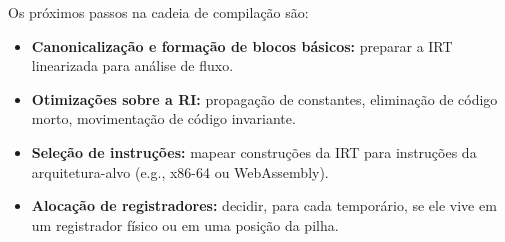 Os próximos passos na cadeia de compilação são:
\begin{itemize}
  \item \textbf{Canonicalização e formação de blocos básicos:}
    preparar a IRT linearizada para análise de fluxo.
  \item \textbf{Otimizações sobre a RI:}
    propagação de constantes, eliminação de código morto,
    movimentação de código invariante.
  \item \textbf{Seleção de instruções:}
    mapear construções da IRT para instruções da arquitetura-alvo
    (e.g., x86-64 ou WebAssembly).
  \item \textbf{Alocação de registradores:}
    decidir, para cada temporário, se ele vive em um registrador físico
    ou em uma posição da pilha.
\end{itemize}
